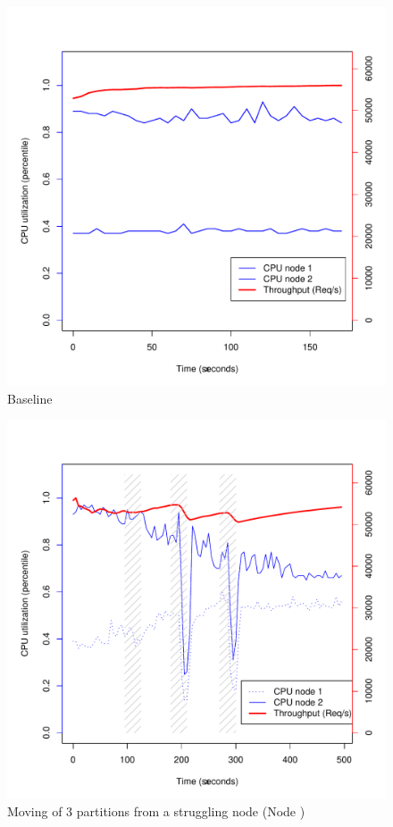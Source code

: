 

\begin{figure}[h]
    \centering
    \includegraphics[width=1.2\textwidth]{results/baseline_plot}
    \caption{Baseline}
    \label{fig:baseline}
\end{figure}

\begin{figure}[h]
    \centering
    \includegraphics[width=1.2\textwidth]{results/adaptive_plot}
    \caption{Moving of 3 partitions from a struggling node (Node )}
    \label{fig:adaptive}
\end{figure}

